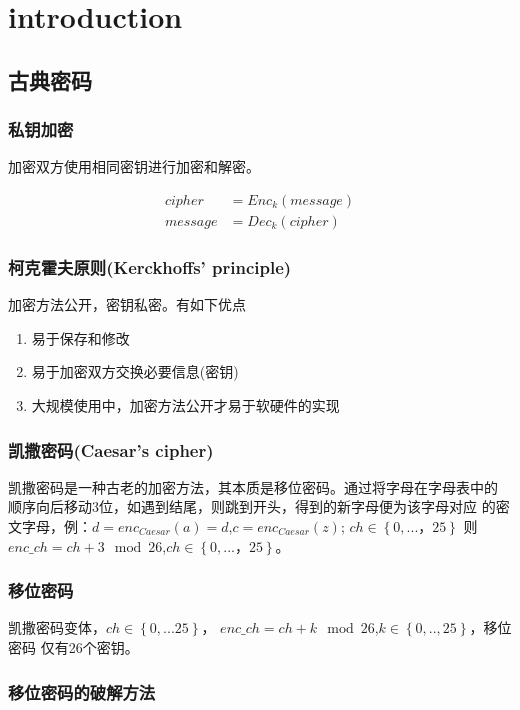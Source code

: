 \documentclass{article}
\begin{document}
	\tableofcontents
	\section{introduction}
	\subsection{古典密码}
	\par\indent
	\subsubsection{私钥加密}
	\par\indent
	加密双方使用相同密钥进行加密和解密。
	\par\indent
	\begin{align}
		cipher &= Enc_k(message) \\
		message &= Dec_k(cipher)
	\end{align}
	\subsubsection{柯克霍夫原则(Kerckhoffs’ principle)}
	加密方法公开，密钥私密。有如下优点
	\begin{enumerate}
		\item 易于保存和修改
		\item 易于加密双方交换必要信息(密钥)
		\item 大规模使用中，加密方法公开才易于软硬件的实现
	\end{enumerate}
	\subsubsection{凯撒密码(Caesar’s cipher)}
	\par\indent
	凯撒密码是一种古老的加密方法，其本质是移位密码。通过将字母在字母表中的
	顺序向后移动3位，如遇到结尾，则跳到开头，得到的新字母便为该字母对应
	的密文字母，例：$d=enc_{Caesar}(a)=d$,$c=enc_{Caesar}(z)$;
	$ch \in{\left\{0,...，25\right\}}$
	则$enc\_ch = ch + 3 \mod 26 $,$ch \in{\left\{0,...，25\right\}}$。
	\subsubsection{移位密码}
	\par\indent
	凯撒密码变体，$ch \in{\left\{0,...25\right\}}$，
	$enc\_ch =ch + k \mod 26$,$k \in{\left\{0,..,25\right\}}$，移位密码
	仅有26个密钥。
	\par\indent
	\subsubsection{移位密码的破解方法}
\end{document}
